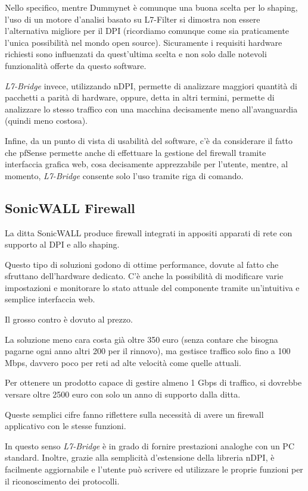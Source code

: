 Nello specifico, mentre Dummynet è comunque una buona scelta per lo shaping, l'uso di un motore d'analisi basato su L7-Filter si dimostra non essere l'alternativa migliore per il DPI (ricordiamo comunque come sia praticamente l'unica possibilità nel mondo open source). Sicuramente i requisiti hardware richiesti sono influenzati da quest'ultima scelta e non solo dalle notevoli funzionalità offerte da questo software.

\emph{L7-Bridge} invece, utilizzando nDPI, permette di analizzare maggiori quantità di pacchetti a parità di hardware, oppure, detta in altri termini, permette di analizzare lo stesso traffico con una macchina decisamente meno all'avanguardia (quindi meno costosa).

Infine, da un punto di vista di usabilità del software, c'è da considerare il fatto che pfSense permette anche di effettuare la gestione del firewall tramite interfaccia grafica web, cosa decisamente apprezzabile per l'utente, mentre, al momento, \emph{L7-Bridge} consente solo l'uso tramite riga di comando.

\subsection{SonicWALL Firewall}

La ditta SonicWALL \cite{sonicwall} produce firewall integrati in appositi apparati di rete con supporto al DPI e allo shaping.

Questo tipo di soluzioni godono di ottime performance, dovute al fatto che sfruttano dell'hardware dedicato. C'è anche la possibilità di modificare varie impostazioni e monitorare lo stato attuale del componente tramite un'intuitiva e semplice interfaccia web.

Il grosso contro è dovuto al prezzo.

La soluzione meno cara costa già oltre 350 euro (senza contare che bisogna pagarne ogni anno altri 200 per il rinnovo), ma gestisce traffico solo fino a 100 Mbps, davvero poco per reti ad alte velocità come quelle attuali.

Per ottenere un prodotto capace di gestire almeno 1 Gbps di traffico, si dovrebbe versare oltre 2500 euro con solo un anno di supporto dalla ditta.

Queste semplici cifre fanno riflettere sulla necessità di avere un firewall applicativo con le stesse funzioni.

In questo senso \emph{L7-Bridge} è in grado di fornire prestazioni analoghe con un PC standard. Inoltre, grazie alla semplicità d'estensione della libreria nDPI, è facilmente aggiornabile e l'utente può scrivere ed utilizzare le proprie funzioni per il riconoscimento dei protocolli.